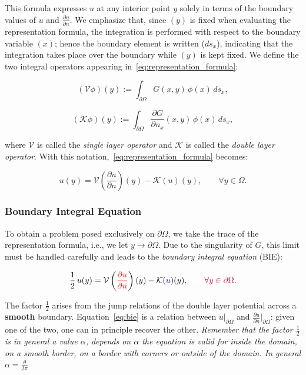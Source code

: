 \documentclass[11pt,onecolumn]{article}
\begin{document}
This formula expresses $u$ at any interior point $y$ solely in terms of the boundary values of $u$ and $\frac{\partial u}{\partial n}$. {\color{cyan} We emphasize that, since $(y)$ is fixed when evaluating the representation formula, the integration is performed with respect to the boundary variable $(x)$; hence the boundary element is written ($ds_{x}$), indicating that the integration takes place over the boundary while $(y)$ is kept fixed.} We define the two integral operators appearing in~\eqref{eq:representation_formula}:

\begin{equation}
(\mathcal{V}\phi)(y) := \int_{\partial\Omega} G(x,y)\, \phi(x)\, ds_x,
\label{eq:single_layer}
\end{equation}

\begin{equation}
(\mathcal{K}\phi)(y) := \int_{\partial\Omega} \frac{\partial G}{\partial n_x}(x,y)\, \phi(x)\, ds_x,
\label{eq:double_layer}
\end{equation}

where $\mathcal{V}$ is called the \textit{single layer operator} and $\mathcal{K}$ is called the \textit{double layer operator}. With this notation,~\eqref{eq:representation_formula} becomes:

\begin{equation}
u(y) = \mathcal{V}\left(\frac{\partial u}{\partial n}\right)(y) - \mathcal{K}(u)(y), \qquad \forall y \in \Omega.
\end{equation}

\subsubsection{Boundary Integral Equation}
To obtain a problem posed exclusively on $\partial\Omega$, we take the trace of the representation formula, i.e., we let $y \to \partial\Omega$. Due to the singularity of $G$, this limit must be handled carefully and leads to the \textit{boundary integral equation} (BIE):

\begin{equation}
\frac{1}{2}\,u(y) = \mathcal{V}\left({\color{red}\frac{\partial u}{\partial n}}\right)(y) - \mathcal{K}({\color{blue}u})(y), 
\qquad{\color{purple} \forall y \in \partial\Omega}.
\label{eq:bie}
\end{equation}

The factor $\frac{1}{2}$ arises from the jump relations of the double layer potential across a \textbf{smooth} boundary. Equation~\eqref{eq:bie} is a relation between $u|_{\partial\Omega}$ and $\frac{\partial u}{\partial n}|_{\partial\Omega}$: given one of the two, one can in principle recover the other. \textit{Remember that the factor $\frac{1}{2}$ is in general a value $\alpha$, depends on $\alpha$ the equation is valid for inside the domain, on a smooth border, on a border with corners or outside of the domain. In general $\alpha = \frac{\theta}{2\pi}$}
\end{document}

